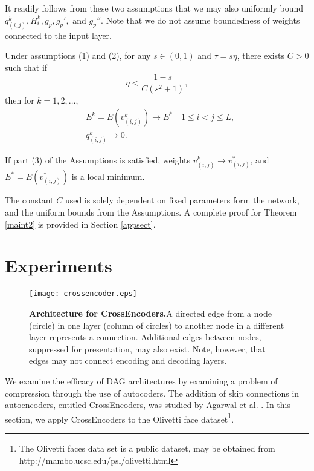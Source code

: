 \documentclass{jcmlatex}
\begin{document}
It readily follows from these two assumptions that we may also uniformly bound  $q_{(i,j)}^k, H_i^k,g_p, g_p',$ and  $g_p''$.  Note that we do not assume boundedness of weights connected to the input layer.

\begin{theorem}\label{maint2}
Under assumptions (1) and (2), for any $s \in (0,1)$ and  $\tau = s\eta$, there exists $C>0$ such that if
\begin{equation}
\eta < \frac{1-s}{C(s^2+1)},
\end{equation}
then for $k = 1,2,\dots$,
\begin{align}
&E^k = E(v_{(i,j)}^k ) \rightarrow E^* \quad 1\le i<j\le L,\\
&q^k_{(i,j)} \rightarrow 0.
\end{align}

If part (3) of the Assumptions is satisfied, weights $v_{(i,j)}^k\rightarrow v_{(i,j)}^*$, and $E^* = E(v_{(i,j)}^*)$ is a local  minimum.
\end{theorem}

The constant $C$ used is solely dependent on fixed parameters form the network, and the uniform bounds from the Assumptions. A complete proof for Theorem \ref{maint2} is provided in Section \ref{appsect}.

\section{Experiments}\label{sec:experiment}\begin{figure}
\centering
\texttt{[image: crossencoder.eps]}
\caption{\textbf{Architecture for CrossEncoders.}A directed edge from a node (circle) in one layer (column of circles) to another node in a different layer represents a connection. Additional edges  between nodes, suppressed for presentation, may also exist. Note, however, that edges may not connect encoding and decoding layers. }\label{autofig}
\end{figure}

We examine the efficacy of DAG architectures by  examining a problem of compression through the use of autocoders. The addition of skip connections in autoencoders, entitled CrossEncoders, was studied by Agarwal et al. \cite{agarwal2018crossencoder}.  In this section, we apply CrossEncoders to the Olivetti face dataset\footnote{ The Olivetti faces data set is a public dataset, may be obtained from http://mambo.ucsc.edu/psl/olivetti.html}.
\end{document}
